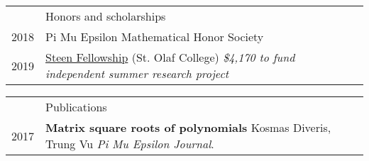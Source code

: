 \documentclass[letterpaper, 11pt]{article}
\newcommand{\headingfont}{\Large\color{Red}}
\newenvironment{SectionTable}[1]{
	\renewcommand*{\arraystretch}{1.7}
	\setlength{\tabcolsep}{10pt}
	\begin{longtable}{Rp{5.2in}} & #1 \\}
	{\end{longtable}\vspace{-.3cm}}
\newenvironment{SectionTableSingleSpace}[1]{
	\renewcommand*{\arraystretch}{1.2}
	\setlength{\tabcolsep}{10pt}
	\begin{longtable}{Rp{5.2in}} & #1 \\[0.6em]}
	{\end{longtable}\vspace{-.3cm}}
\begin{document}
	\begin{SectionTableSingleSpace}{\headingfont Honors and scholarships}
		2018 & 
		Pi Mu Epsilon Mathematical Honor Society \\
		
		2019 &
		\href{https://wp.stolaf.edu/curi/summer-undergraduate-research}{Steen Fellowship} (St. Olaf College) \newline 
		\textit{\$4,170  to fund independent summer research project}
		\\
		

	\end{SectionTableSingleSpace}
	
	
	\begin{SectionTable}{\headingfont Publications} 
		2017 & 
		\textbf{Matrix square roots of polynomials} \newline
		Kosmas Diveris, Trung Vu \newline
		\textit{Pi Mu Epsilon Journal}. \\
		
		
		
	\end{SectionTable}
	
	
\end{document}
